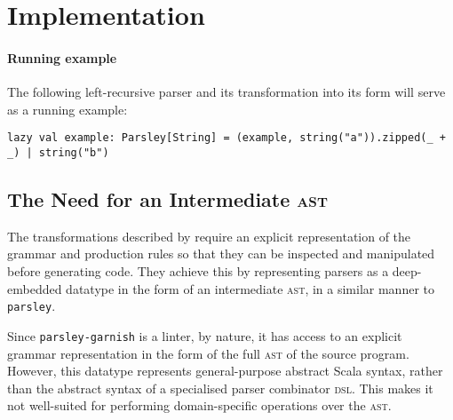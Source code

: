 \documentclass[../../main.tex]{subfiles}
\begin{document}

\section{Implementation}

\paragraph{Running example}
The following left-recursive parser and its transformation into its  form will serve as a running example:
\begin{verbatim}
lazy val example: Parsley[String] = (example, string("a")).zipped(_ + _) | string("b")
\end{verbatim}

\subsection{The Need for an Intermediate \textsc{ast}}\label{sec:parser-ast-motivation}
The transformations described by \textcite{baars_leftrec_2004} require an explicit representation of the grammar and production rules so that they can be inspected and manipulated before generating code.
They achieve this by representing parsers as a deep-embedded datatype in the form of an intermediate \textsc{ast}, in a similar manner to \texttt{parsley}.

Since \texttt{parsley-garnish} is a linter, by nature, it has access to an explicit grammar representation in the form of the full  \textsc{ast} of the source program.
However, this datatype represents general-purpose abstract Scala syntax, rather than the abstract syntax of a specialised parser combinator \textsc{dsl}.
This makes it not well-suited for performing domain-specific operations over the \textsc{ast}.
\end{document}
